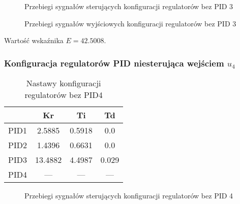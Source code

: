 
\ifdefined\CompileFigures
\begin{figure}[H] 
    \centering
    
    \caption{Przebiegi sygnałów sterujących konfiguracji regulatorów bez PID 3}
    \label{projekt:zad5:figure:projzadanie5PIDbezu3u}
\end{figure}
\fi

\ifdefined\CompileFigures
\begin{figure}[H] 
    \centering
    
    \caption{Przebiegi sygnałów wyjściowych konfiguracji regulatorów bez PID 3}
    \label{projekt:zad5:figure:projzadanie5PIDbezu3y}
\end{figure}
\fi

Wartość wskaźnika $E=\num{42.5008}$.

\newpage
\subsubsection{Konfiguracja regulatorów PID niesterująca wejściem $u_{4}$}

\begin{table}[H]
    \centering
    \begin{tabular}{|l|c|c|c|}
    \hline
         & Kr  & Ti  & Td  \\ \hline
    PID1 & 2.5885 & 0.5918 & 0.0 \\ \hline
    PID2 & 1.4396 & 0.6631 & 0.0 \\ \hline
    PID3 & 13.4882 & 4.4987 & 0.029 \\ \hline
    PID4 & --- & --- & --- \\ \hline
    \end{tabular}
    \caption[H]{Nastawy konfiguracji regulatorów bez PID4}
\end{table}


\ifdefined\CompileFigures
\begin{figure}[H] 
    \centering
    
    \caption{Przebiegi sygnałów sterujących konfiguracji regulatorów bez PID 4}
    \label{projekt:zad5:figure:projzadanie5PIDbezu4u}
\end{figure}
\fi

